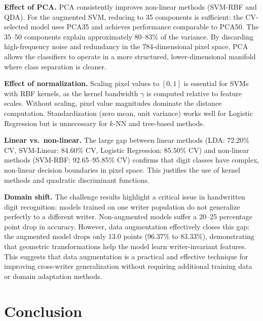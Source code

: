 \documentclass[11pt,a4paper,twocolumn]{article}
\begin{document}
\textbf{Effect of PCA.} PCA consistently improves non-linear methods (SVM-RBF and QDA). For the augmented SVM, reducing to 35 components is sufficient: the CV-selected model uses PCA35 and achieves performance comparable to PCA50. The 35--50 components explain approximately 80--83\% of the variance. By discarding high-frequency noise and redundancy in the 784-dimensional pixel space, PCA allows the classifiers to operate in a more structured, lower-dimensional manifold where class separation is cleaner.

\textbf{Effect of normalization.} Scaling pixel values to $[0, 1]$ is essential for SVMs with RBF kernels, as the kernel bandwidth $\gamma$ is computed relative to feature scales. Without scaling, pixel value magnitudes dominate the distance computation. Standardization (zero mean, unit variance) works well for Logistic Regression but is unnecessary for $k$-NN and tree-based methods.

\textbf{Linear vs.~non-linear.} The large gap between linear methods (LDA: 72.20\% CV, SVM-Linear: 84.60\% CV, Logistic Regression: 85.50\% CV) and non-linear methods (SVM-RBF: 92.65--95.85\% CV) confirms that digit classes have complex, non-linear decision boundaries in pixel space. This justifies the use of kernel methods and quadratic discriminant functions.

\textbf{Domain shift.} The challenge results highlight a critical issue in handwritten digit recognition: models trained on one writer population do not generalize perfectly to a different writer. Non-augmented models suffer a 20--25 percentage point drop in accuracy. However, data augmentation effectively closes this gap: the augmented model drops only 13.0 points (96.37\% to 83.33\%), demonstrating that geometric transformations help the model learn writer-invariant features. This suggests that data augmentation is a practical and effective technique for improving cross-writer generalization without requiring additional training data or domain adaptation methods.

\section{Conclusion}
\end{document}
